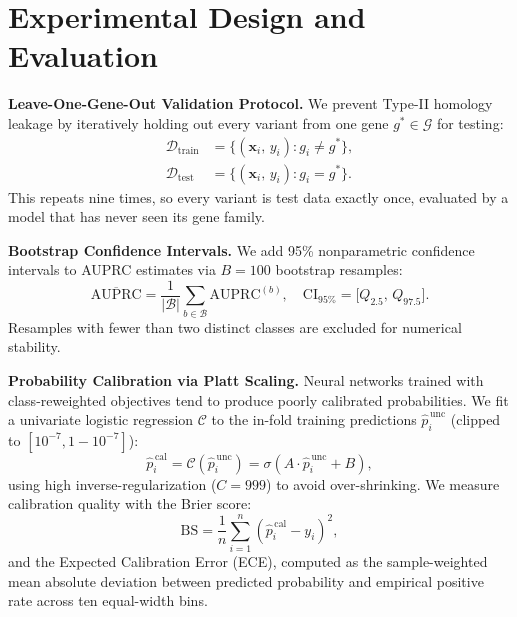 \documentclass[conference]{IEEEtran}
\begin{document}
\section{Experimental Design and Evaluation}
\label{sec:experimental_setup}

\vspace{2mm}\noindent\textbf{Leave-One-Gene-Out Validation Protocol.}
We prevent Type-II homology leakage \cite{grimm2015circularity} by iteratively holding out every variant from one gene $g^* \in \mathcal{G}$ for testing:
\begin{align}
  \mathcal{D}_\mathrm{train} &= \bigl\{(\mathbf{x}_i,\,y_i) : g_i \neq g^*\bigr\}, \\
  \mathcal{D}_\mathrm{test}  &= \bigl\{(\mathbf{x}_i,\,y_i) : g_i  =  g^*\bigr\}.
\end{align}
This repeats nine times, so every variant is test data exactly once, evaluated by a model that has never seen its gene family.

\vspace{2mm}\noindent\textbf{Bootstrap Confidence Intervals.}
We add 95\% nonparametric confidence intervals to AUPRC estimates via $B = 100$ bootstrap resamples:
\begin{equation}
  \overline{\mathrm{AUPRC}} = \frac{1}{|\mathcal{B}|}\sum_{b\in\mathcal{B}}\mathrm{AUPRC}^{(b)}, \quad
  \mathrm{CI}_{95\%} = \bigl[Q_{2.5},\,Q_{97.5}\bigr].
\end{equation}
Resamples with fewer than two distinct classes are excluded for numerical stability.

\vspace{2mm}\noindent\textbf{Probability Calibration via Platt Scaling.}\label{sec:platt}
Neural networks trained with class-reweighted objectives tend to produce poorly calibrated probabilities. We fit a univariate logistic regression $\mathcal{C}$ to the in-fold training predictions $\hat{p}_i^{\,\mathrm{unc}}$ (clipped to $[10^{-7}, 1-10^{-7}]$):
\begin{equation}
  \hat{p}_i^{\,\mathrm{cal}} = \mathcal{C}\!\left(\hat{p}_i^{\,\mathrm{unc}}\right) = \sigma\!\left(A\cdot\hat{p}_i^{\,\mathrm{unc}} + B\right),
  \label{eq:platt}
\end{equation}
using high inverse-regularization ($C=999$) to avoid over-shrinking. We measure calibration quality with the Brier score:
\begin{equation}
  \mathrm{BS} = \frac{1}{n}\sum_{i=1}^{n}(\hat{p}_i^{\,\mathrm{cal}} - y_i)^2,
  \label{eq:brier}
\end{equation}
and the Expected Calibration Error (ECE), computed as the sample-weighted mean absolute deviation between predicted probability and empirical positive rate across ten equal-width bins.
\end{document}
